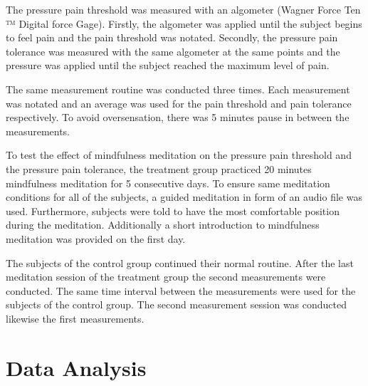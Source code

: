 The pressure pain threshold was measured with an algometer (Wagner Force Ten ™  Digital force Gage). Firstly, the algometer was applied until the subject begins to feel pain and the pain threshold was notated. Secondly, the pressure pain tolerance was measured with the same algometer at the same points and the pressure was applied until the subject reached the maximum level of pain.

The same measurement routine was conducted three times. Each measurement was notated and an average was used for the pain threshold and pain tolerance respectively. To avoid oversensation, there was 5 minutes pause in between the measurements. 

To test the effect of mindfulness meditation on the pressure pain threshold and the pressure pain tolerance, the treatment group practiced 20 minutes mindfulness meditation for 5 consecutive days. To ensure same meditation conditions for all of the subjects, a guided meditation in form of an audio file was used. Furthermore, subjects were told to have the most comfortable position during the meditation.  Additionally a short introduction to mindfulness meditation was provided on the first day. 

The subjects of the control group continued their normal routine.
After the last meditation session of the treatment group the second measurements were conducted. The same time interval between the measurements were used for the subjects of the control group. The second measurement session was conducted likewise the first measurements.


\section{Data Analysis}

